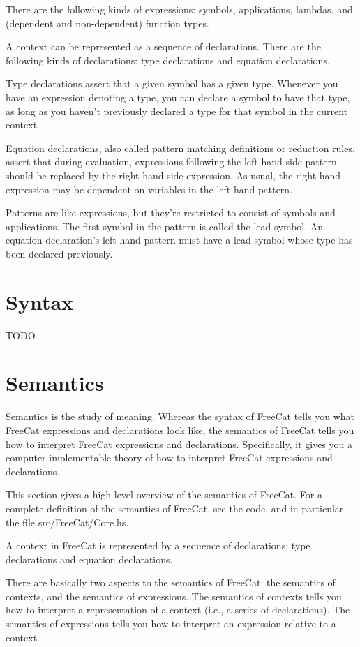 \documentclass{article}
\begin{document}
There are the following kinds of expressions: symbols, applications, lambdas, and (dependent and non-dependent) function types.

A context can be represented as a sequence of declarations. There are the following kinds of declarations: type declarations and equation declarations.

Type declarations assert that a given symbol has a given type. Whenever you have an expression denoting a type, you can declare a symbol to have that type, as long as you haven't previously declared a type for that symbol in the current context.

Equation declarations, also called pattern matching definitions or reduction rules, assert that during evaluation, expressions following the left hand side pattern should be replaced by the right hand side expression. As usual, the right hand expression may be dependent on variables in the left hand pattern.

Patterns are like expressions, but they're restricted to consist of symbols and applications. The first symbol in the pattern is called the lead symbol. An equation declaration's left hand pattern must have a lead symbol whose type has been declared previously.

\section{Syntax}

TODO

\section{Semantics}

Semantics is the study of meaning. Whereas the syntax of FreeCat tells you what FreeCat expressions and declarations look like, the semantics of FreeCat tells you how to interpret FreeCat expressions and declarations. Specifically, it gives you a computer-implementable theory of how to interpret FreeCat expressions and declarations.

This section gives a high level overview of the semantics of FreeCat. For a complete definition of the semantics of FreeCat, see the code, and in particular the file src/FreeCat/Core.hs.

A context in FreeCat is represented by a sequence of declarations: type declarations and equation declarations.

There are basically two aspects to the semantics of FreeCat: the semantics of contexts, and the semantics of expressions. The semantics of contexts tells you how to interpret a representation of a context (i.e., a series of declarations). The semantics of expressions tells you how to interpret an expression relative to a context.
\end{document}

